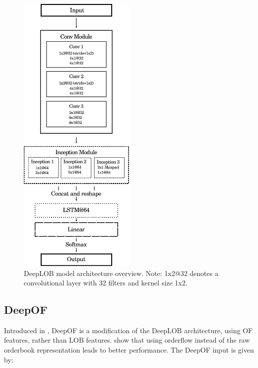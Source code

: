 \begin{multicols}{2}
\columnbreak
\begin{figure}[H]
    \centering
    \includegraphics[width=0.50\textwidth]{./images/deepLOB_architecture_long.pdf}
    \caption{DeepLOB model architecture overview. Note: 1x2@32 denotes a convolutional layer with 32 filters and kernel size 1x2.}
    \label{fig:DeepLOB}
\end{figure}
\end{multicols}
\clearpage

\subsection{DeepOF}
Introduced in \cite{KOLM2023}, DeepOF is a modification of the DeepLOB architecture, using
OF features, rather than LOB features. \cite{KOLM2023} show that using orderflow
instead of the raw orderbook representation leads to better performance.
The DeepOF input is given by:

